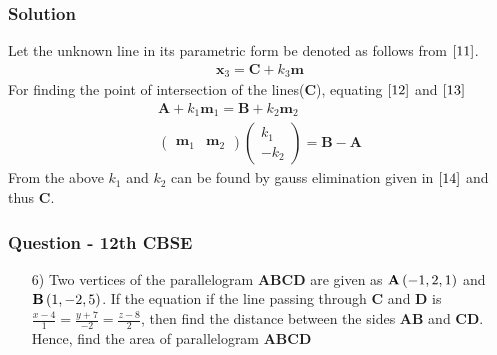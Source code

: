 \documentclass{beamer}
\begin{document}
\begin{frame}
\frametitle{Solution}
Let the unknown line in its parametric form be denoted as follows from $\eqref{11}$.
\begin{align}
    \textbf{x}_3 = \textbf{C} + k_3\textbf{m}
\end{align}
For finding the point of intersection of the lines($\textbf{C}$), equating $\eqref{12}$ and $\eqref{13}$
\begin{align}
    \textbf{A} + k_1\textbf{m}_1 = \textbf{B} + k_2\textbf{m}_2\\
    \begin{pmatrix}
        \textbf{m}_1 & \textbf{m}_2
    \end{pmatrix}\begin{pmatrix}
        k_1 \\
        -k_2
    \end{pmatrix} = \textbf{B}-\textbf{A}
\end{align}
From the above $k_1$ and $k_2$ can be found by gauss elimination given in $\eqref{14}$ and thus $\textbf{C}$.

\end{frame}









\begin{frame}
\frametitle{Question - 12th CBSE}
\begin{enumerate}
    \item [6)]
Two vertices of the parallelogram $\textbf{ABCD}$ are given as $\textbf{A}\left(-1,2,1\right)$ and $\textbf{B}\left(1,-2,5\right)$. If the equation if the line passing through $\textbf{C}$ and $\textbf{D}$ is $\frac{x-4}{1} = \frac{y+7}{-2} = \frac{z-8}{2}$, then find the distance between the sides $\textbf{AB}$ and $\textbf{CD}$. Hence, find the area of parallelogram $\textbf{ABCD}$
\end{enumerate}
\end{frame}
\end{document}
